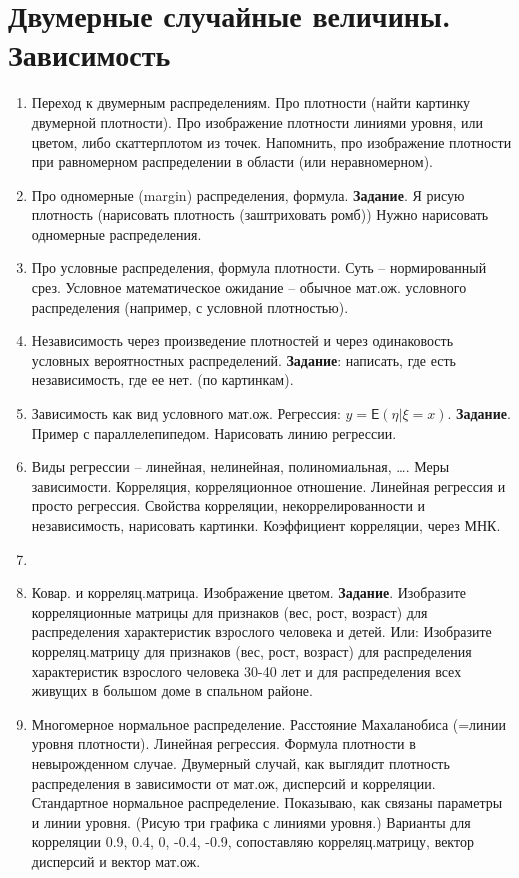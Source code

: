 \section{Двумерные случайные величины. Зависимость}

\begin{enumerate}
\item	Переход к двумерным распределениям. Про плотности (найти картинку двумерной плотности). Про изображение плотности линиями уровня, или цветом, либо скаттерплотом из точек. Напомнить, про изображение плотности при равномерном распределении в области (или неравномерном).
\item	Про одномерные (margin) распределения, формула. \textbf{Задание}. Я рисую плотность (нарисовать плотность (заштриховать ромб)) Нужно нарисовать одномерные распределения.
\item	Про условные распределения, формула плотности. Суть – нормированный срез. Условное математическое ожидание – обычное мат.ож. условного распределения (например, с условной плотностью).
\item	Независимость через произведение плотностей и через одинаковость условных вероятностных распределений. \textbf{Задание}: написать, где есть независимость, где ее нет. (по картинкам).
\item	Зависимость как вид условного мат.ож. Регрессия: $y = \textsf{E}(\eta | \xi = x)$. \textbf{Задание}. Пример с параллелепипедом. Нарисовать линию регрессии.
\item	Виды регрессии – линейная, нелинейная, полиномиальная, …. Меры зависимости. Корреляция, корреляционное отношение. Линейная регрессия и просто регрессия. Свойства корреляции, некоррелированности и независимость, нарисовать картинки. Коэффициент корреляции, через МНК.
\item	
\item	Ковар. и корреляц.матрица. Изображение цветом. \textbf{Задание}. Изобразите корреляционные матрицы для признаков (вес, рост, возраст) для распределения характеристик взрослого человека и детей.
    Или:  Изобразите корреляц.матрицу для признаков (вес, рост, возраст) для распределения характеристик взрослого человека 30-40 лет и для распределения всех живущих в большом доме в спальном районе.
\item
Многомерное нормальное распределение. Расстояние Махаланобиса (=линии уровня плотности). Линейная регрессия. Формула плотности в невырожденном случае. Двумерный случай, как выглядит плотность распределения в зависимости от мат.ож, дисперсий и корреляции. Стандартное нормальное распределение. Показываю, как связаны параметры и линии уровня. (Рисую три графика с линиями уровня.)  Варианты для корреляции 0.9, 0.4, 0, -0.4, -0.9, сопоставляю корреляц.матрицу, вектор дисперсий и вектор мат.ож.


\end{enumerate}
